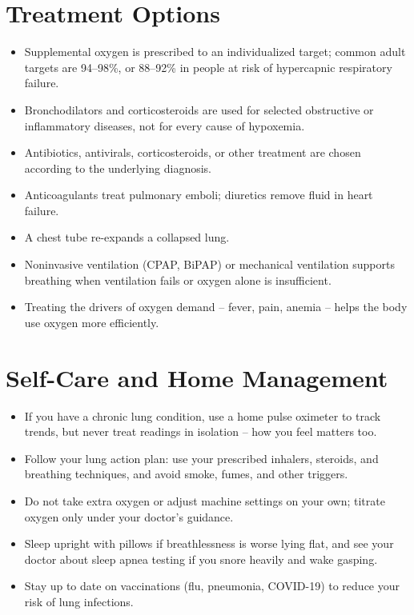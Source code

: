 \section*{Treatment Options}
\begin{itemize}
  \item Supplemental oxygen is prescribed to an individualized target; common adult targets are 94--98\%, or 88--92\% in people at risk of hypercapnic respiratory failure.
  \item Bronchodilators and corticosteroids are used for selected obstructive or inflammatory diseases, not for every cause of hypoxemia.
  \item Antibiotics, antivirals, corticosteroids, or other treatment are chosen according to the underlying diagnosis.
  \item Anticoagulants treat pulmonary emboli; diuretics remove fluid in heart failure.
  \item A chest tube re-expands a collapsed lung.
  \item Noninvasive ventilation (CPAP, BiPAP) or mechanical ventilation supports breathing when ventilation fails or oxygen alone is insufficient.
  \item Treating the drivers of oxygen demand -- fever, pain, anemia -- helps the body use oxygen more efficiently.
\end{itemize}


\section*{Self-Care and Home Management}
\begin{itemize}
  \item If you have a chronic lung condition, use a home pulse oximeter to track trends, but never treat readings in isolation -- how you feel matters too.
  \item Follow your lung action plan: use your prescribed inhalers, steroids, and breathing techniques, and avoid smoke, fumes, and other triggers.
  \item Do not take extra oxygen or adjust machine settings on your own; titrate oxygen only under your doctor's guidance.
  \item Sleep upright with pillows if breathlessness is worse lying flat, and see your doctor about sleep apnea testing if you snore heavily and wake gasping.
  \item Stay up to date on vaccinations (flu, pneumonia, COVID-19) to reduce your risk of lung infections.
\end{itemize}

